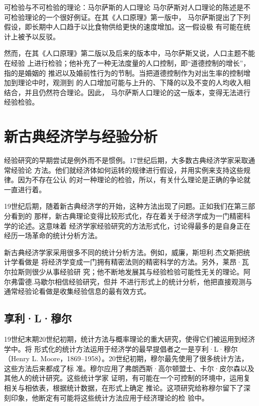 \begin{mybox}{可检验与不可检验的理论：马尔萨斯的人口理论}
  马尔萨斯对人口理论的陈述是不可检验理论的一个很好例证。在其《人口原理》第一版中，
  马尔萨斯提出了下列假设，即长期中人口趋于以比食物供给更快的速度增加。这一假设极
  有可能在统计上被予以反驳。

  然而，在其《人口原理》第二版以及后来的版本中，马尔萨斯又说，人口主题不能在经验
  上进行检验；他补充了一种无法度量的人口控制，即“道德控制的增长”，指的是婚姻的
  推迟以及婚前性行为的节制。当把道德控制作为对出生率的控制增加到理论中时，观测到
  的人口增加可能与上升的、下降的以及不变的人均收入相结合，并且仍然符合理论。因此，
  马尔萨斯人口理论的这一版本，变得无法进行经验检验。
\end{mybox}

\section{新古典经济学与经验分析}

经验研究的早期尝试是例外而不是惯例。17世纪后期，大多数古典经济学家采取通常经验论
方法。他们就经济体如何运转的规律进行假设，并用实例来支持这些规律。因为不存在公认
的对一种理论的检验，所以，有关什么理论是正确的争论就一直进行着。

19世纪后期，随着新古典经济学的开始，这种方法出现了问题。正如我们在第三部分看到的
那样，新古典理论变得比较形式化，存在着关于经济学成为一门精密科学的论述。这意味着
经济学家经验研究的方法形式化，讨论得最多的是自身正在经历一场革命的统计分析方法。

新古典经济学家采用很多不同的统计分析方法。例如，威廉，斯坦利.杰文斯把统计学看做是
将经济学变成一门拥有精密法则的精密科学的方法。另外，莱昂·瓦尔拉斯则很少从事经验研
究；他不断地发展其与经验检验可能性无关的理论。阿尔弗雷德.马歇尔相信经验研究，但并
不进行形式上的统计分析，他把直接观测与通常经验论看做是收集经验信息的最有效方式。

\subsection{享利·L·穆尔}

19世纪末期20世纪初期，统计方法与概率理论的重大研究，使得它们被运用到经济学中。将
形式化的统计方法运用于经济学的最早提倡者之一是亨利·L·穆尔（Henry L.
Moore，1869--1958）。20世纪初期，穆尔最先使用了很多统计方法，这些方法后来都成了标
准。穆尔应用了弗朗西斯·高尔顿盟士、卡尔·皮尔森以及其他人的统计研究。这些统计学家
证明，有可能在一个可控制的环境中，运用复相关与相依表，根据统计数据，在形式上确定
推论。这项研究给称穆尔留下了深刻印象，他断定有可能将这些统计方法应用于经济理论的检
验中。

